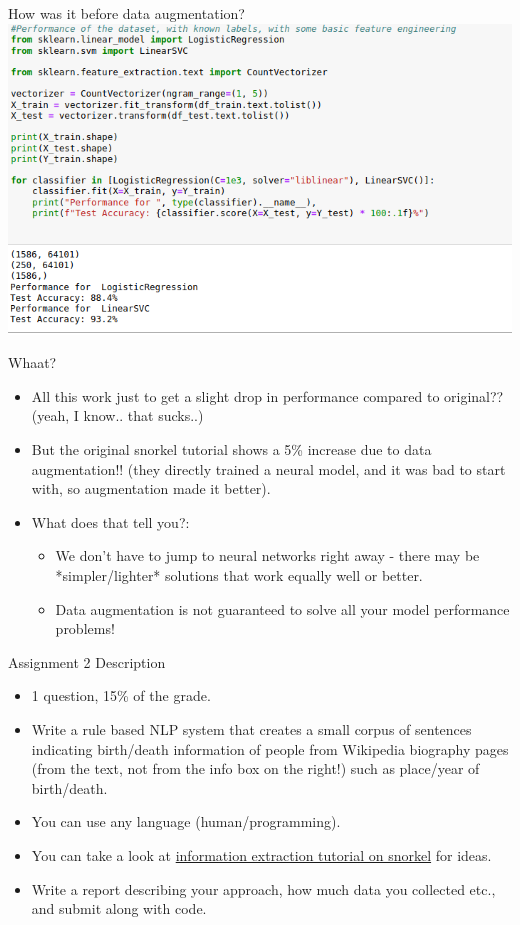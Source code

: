 \documentclass{beamer}
\begin{document}
\begin{frame}{How was it before data augmentation?}
            \includegraphics[width=\textwidth]{figures/originalclassifier.png}
\end{frame}

\begin{frame}{Whaat?}
  \begin{itemize}
  \item All this work just to get a slight drop in performance compared to original?? (yeah, I know.. that sucks..)
  \item But the original snorkel tutorial shows a 5\% increase due to data augmentation!! (they directly trained a neural model, and it was bad to start with, so augmentation made it better).
  \item What does that tell you?:  \pause
  \begin{itemize}
      \item We don't have to jump to neural networks right away - there may be *simpler/lighter* solutions that work equally well or better.
      \item Data augmentation is not guaranteed to solve all your model performance problems!
  \end{itemize}
  \end{itemize}
\end{frame}

\begin{frame}{Assignment 2 Description}
\begin{itemize}
    \item 1 question, 15\% of the grade.
    \item Write a rule based NLP system that creates a small corpus of sentences indicating birth/death information of people from Wikipedia biography pages (from the text, not from the info box on the right!) such as place/year of birth/death. 
    \item You can use any language (human/programming).
    \item You can take a look at \href{https://www.snorkel.org/use-cases/spouse-demo}{information extraction tutorial on snorkel} for ideas. 
    \item Write a report describing your approach, how much data you collected etc., and submit along with code. 
\end{itemize}
\end{frame}
\end{document}

